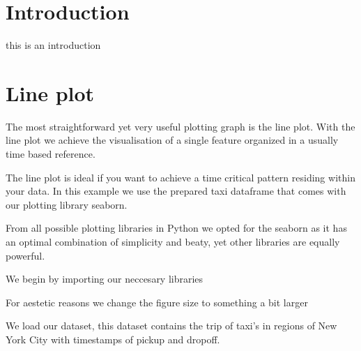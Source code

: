 \documentclass[letterpaper,10pt,english]{jupyterBook}
\begin{document}
\chapter{Introduction}
\label{\detokenize{c4_data_visualisation/introduction:introduction}}\label{\detokenize{c4_data_visualisation/introduction::doc}}
\sphinxAtStartPar
this is an introduction


\chapter{Line plot}
\label{\detokenize{c4_data_visualisation/line:line-plot}}\label{\detokenize{c4_data_visualisation/line::doc}}
\sphinxAtStartPar
The most straight\sphinxhyphen{}forward yet very useful plotting graph is the line plot.
With the line plot we achieve the visualisation of a single feature organized in a usually time based reference.

\sphinxAtStartPar
The line plot is ideal if you want to achieve a time critical pattern residing within your data.
In this example we use the prepared taxi dataframe that comes with our plotting library seaborn.

\sphinxAtStartPar
From all possible plotting libraries in Python we opted for the seaborn as it has an optimal combination of simplicity and beaty, yet other libraries are equally powerful.

\sphinxAtStartPar
We begin by importing our neccesary libraries

\begin{sphinxVerbatim}[commandchars=\\\{\}]
   
   
\end{sphinxVerbatim}

\sphinxAtStartPar
For aestetic reasons we change the figure size to something a bit larger

\begin{sphinxVerbatim}[commandchars=\\\{\}]
\end{sphinxVerbatim}

\sphinxAtStartPar
We load our dataset, this dataset contains the trip of taxi’s in regions of New York City with timestamps of pickup and dropoff.
\end{document}

